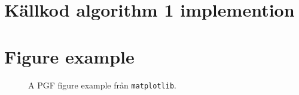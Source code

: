 \documentclass[a4paper]{article}
\begin{document}
\section{Källkod algorithm 1 implemention}
\label{app:source_code2}


\section{Figure example}
\begin{figure}[h]
    \begin{center}
        
    \end{center}
    \caption{A PGF figure example från \texttt{matplotlib}.}
\end{figure}
\end{document}
